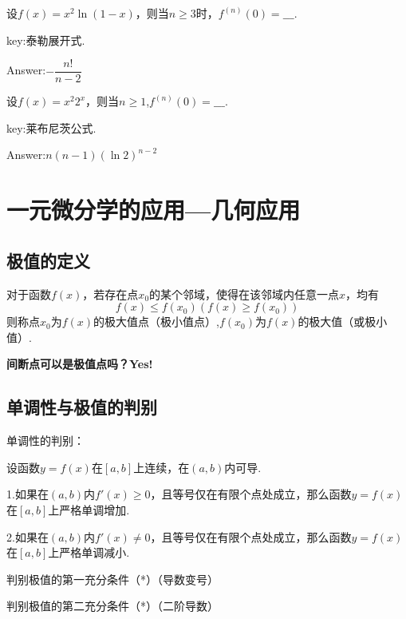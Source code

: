 \documentclass[12pt, a4paper, oneside]{ctexbook}
\begin{document}
\hspace*{\fill}

设$f(x)=x^2 \ln (1-x)$，则当$n \geqslant 3$时，$f^{(n)}(0)=\_\_\_.$

key:泰勒展开式.

Answer:$-\dfrac{n!}{n-2}$

\hspace*{\fill}

设$f(x)=x^2 2^x$，则当$n \geqslant 1$,$f^{(n)}(0)=\_\_\_.$

key:莱布尼茨公式.

Answer:$n(n-1)(\ln 2)^{n-2}$

\hspace*{\fill}

\chapter{一元微分学的应用---几何应用}

\section{极值的定义}

对于函数$f(x)$，若存在点$x_0$的某个邻域，使得在该邻域内任意一点$x$，均有\[f(x)\leq f(x_0) (f(x)\geqslant f(x_0))\]则称点$x_0$为$f(x)$的极大值点（极小值点）,$f(x_0)$为$f(x)$的极大值（或极小值）.

\hspace*{\fill}

\textbf{间断点可以是极值点吗？Yes!}

\section{单调性与极值的判别}

单调性的判别：

设函数$y=f(x)$在$[a,b]$上连续，在$(a,b)$内可导.

1.如果在$(a,b)$内$f'(x)\geq 0$，且等号仅在有限个点处成立，那么函数$y=f(x)$在$[a,b]$上严格单调增加.

2.如果在$(a,b)$内$f'(x)\neq 0$，且等号仅在有限个点处成立，那么函数$y=f(x)$在$[a,b]$上严格单调减小.

\hspace*{\fill}


判别极值的第一充分条件（*）（导数变号）

\hspace*{\fill}

判别极值的第二充分条件（*）（二阶导数）
\end{document}
